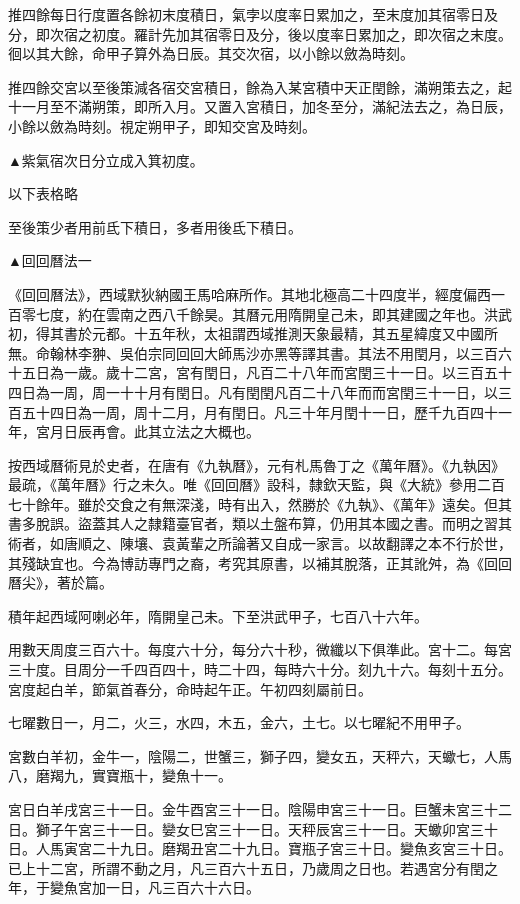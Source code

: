 推四餘每日行度置各餘初末度積日，氣孛以度率日累加之，至末度加其宿零日及分，即次宿之初度。羅計先加其宿零日及分，後以度率日累加之，即次宿之末度。徊以其大餘，命甲子算外為日辰。其交次宿，以小餘以斂為時刻。

推四餘交宮以至後策減各宿交宮積日，餘為入某宮積中天正閏餘，滿朔策去之，起十一月至不滿朔策，即所入月。又置入宮積日，加冬至分，滿紀法去之，為日辰，小餘以斂為時刻。視定朔甲子，即知交宮及時刻。

▲紫氣宿次日分立成入箕初度。

以下表格略

至後策少者用前氐下積日，多者用後氐下積日。

▲回回曆法一

《回回曆法》，西域默狄納國王馬哈麻所作。其地北極高二十四度半，經度偏西一百零七度，約在雲南之西八千餘昊。其曆元用隋開皇己未，即其建國之年也。洪武初，得其書於元都。十五年秋，太祖謂西域推測天象最精，其五星緯度又中國所無。命翰林李翀、吳伯宗同回回大師馬沙亦黑等譯其書。其法不用閏月，以三百六十五日為一歲。歲十二宮，宮有閏日，凡百二十八年而宮閏三十一日。以三百五十四日為一周，周一十十月有閏日。凡有閏閏凡百二十八年而而宮閏三十一日，以三百五十四日為一周，周十二月，月有閏日。凡三十年月閏十一日，歷千九百四十一年，宮月日辰再會。此其立法之大概也。

按西域曆術見於史者，在唐有《九執曆》，元有札馬魯丁之《萬年曆》。《九執因》最疏，《萬年曆》行之未久。唯《回回曆》設科，隸欽天監，與《大統》參用二百七十餘年。雖於交食之有無深淺，時有出入，然勝於《九執》、《萬年》遠矣。但其書多脫誤。盜蓋其人之隸籍臺官者，類以土盤布算，仍用其本國之書。而明之習其術者，如唐順之、陳壤、袁黃輩之所論著又自成一家言。以故翻譯之本不行於世，其殘缺宜也。今為博訪專門之裔，考究其原書，以補其脫落，正其訛舛，為《回回曆尖》，著於篇。

積年起西域阿喇必年，隋開皇己未。下至洪武甲子，七百八十六年。

用數天周度三百六十。每度六十分，每分六十秒，微纖以下俱準此。宮十二。每宮三十度。目周分一千四百四十，時二十四，每時六十分。刻九十六。每刻十五分。宮度起白羊，節氣首春分，命時起午正。午初四刻屬前日。

七曜數日一，月二，火三，水四，木五，金六，土七。以七曜紀不用甲子。

宮數白羊初，金牛一，陰陽二，世蟹三，獅子四，變女五，天秤六，天蠍七，人馬八，磨羯九，實寶瓶十，變魚十一。

宮日白羊戌宮三十一日。金牛酉宮三十一日。陰陽申宮三十一日。巨蟹未宮三十二日。獅子午宮三十一日。孌女巳宮三十一日。天秤辰宮三十一日。天蠍卯宮三十日。人馬寅宮二十九日。磨羯丑宮二十九日。寶瓶子宮三十日。變魚亥宮三十日。已上十二宮，所謂不動之月，凡三百六十五日，乃歲周之日也。若遇宮分有閏之年，于變魚宮加一日，凡三百六十六日。

